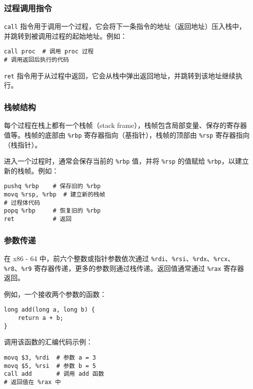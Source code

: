 \subsubsection{过程调用指令}
\texttt{call} 指令用于调用一个过程，它会将下一条指令的地址（返回地址）压入栈中，并跳转到被调用过程的起始地址。例如：
\begin{verbatim}
call proc  # 调用 proc 过程
# 调用返回后执行的代码
\end{verbatim}
\texttt{ret} 指令用于从过程中返回，它会从栈中弹出返回地址，并跳转到该地址继续执行。

\subsubsection{栈帧结构}
每个过程在栈上都有一个栈帧（stack frame），栈帧包含局部变量、保存的寄存器值等。栈帧的底部由 \texttt{\%rbp} 寄存器指向（基指针），栈帧的顶部由 \texttt{\%rsp} 寄存器指向（栈指针）。

进入一个过程时，通常会保存当前的 \texttt{\%rbp} 值，并将 \texttt{\%rsp} 的值赋给 \texttt{\%rbp}，以建立新的栈帧。例如：
\begin{verbatim}
pushq %rbp    # 保存旧的 %rbp
movq %rsp, %rbp  # 建立新的栈帧
# 过程体代码
popq %rbp     # 恢复旧的 %rbp
ret           # 返回
\end{verbatim}

\subsubsection{参数传递}
在 x86 - 64 中，前六个整数或指针参数依次通过 \texttt{\%rdi}、\texttt{\%rsi}、\texttt{\%rdx}、\texttt{\%rcx}、\texttt{\%r8}、\texttt{\%r9} 寄存器传递，更多的参数则通过栈传递。返回值通常通过 \texttt{\%rax} 寄存器返回。

例如，一个接收两个参数的函数：
\begin{verbatim}
long add(long a, long b) {
    return a + b;
}
\end{verbatim}
调用该函数的汇编代码示例：
\begin{verbatim}
movq $3, %rdi  # 参数 a = 3
movq $5, %rsi  # 参数 b = 5
call add       # 调用 add 函数
# 返回值在 %rax 中
\end{verbatim}